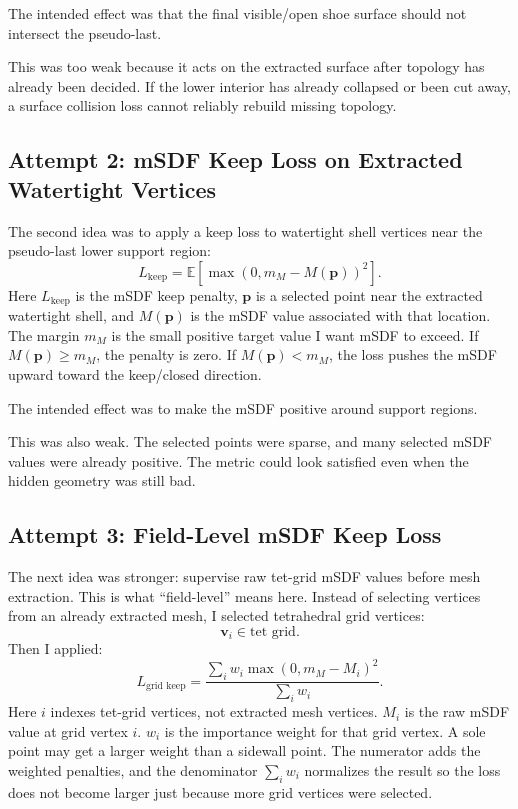 \documentclass[11pt]{article}
\newcommand{\pt}{\mathbf{p}}
\newcommand{\vtx}{\mathbf{v}}
\begin{document}
The intended effect was that the final visible/open shoe surface should not
intersect the pseudo-last.

This was too weak because it acts on the extracted surface after topology has
already been decided.  If the lower interior has already collapsed or been cut
away, a surface collision loss cannot reliably rebuild missing topology.

\subsection{Attempt 2: mSDF Keep Loss on Extracted Watertight Vertices}

The second idea was to apply a keep loss to watertight shell vertices near the
pseudo-last lower support region:
\[
L_{\text{keep}}
=
\mathbb{E}
\left[
\max(0,m_M-M(\pt))^2
\right].
\]
Here \(L_{\text{keep}}\) is the mSDF keep penalty, \(\pt\) is a selected point
near the extracted watertight shell, and \(M(\pt)\) is the mSDF value associated
with that location.  The margin \(m_M\) is the small positive target value I
want mSDF to exceed.  If \(M(\pt)\ge m_M\), the penalty is zero.  If
\(M(\pt)<m_M\), the loss pushes the mSDF upward toward the keep/closed
direction.

The intended effect was to make the mSDF positive around support regions.

This was also weak.  The selected points were sparse, and many selected mSDF
values were already positive.  The metric could look satisfied even when the
hidden geometry was still bad.

\subsection{Attempt 3: Field-Level mSDF Keep Loss}

The next idea was stronger: supervise raw tet-grid mSDF values before mesh
extraction.  This is what ``field-level'' means here.  Instead of selecting
vertices from an already extracted mesh, I selected tetrahedral grid vertices:
\[
\vtx_i \in \text{tet grid}.
\]
Then I applied:
\[
L_{\text{grid keep}}
=
\frac{\sum_i w_i\max(0,m_M-M_i)^2}{\sum_i w_i}.
\]
Here \(i\) indexes tet-grid vertices, not extracted mesh vertices.  \(M_i\) is
the raw mSDF value at grid vertex \(i\).  \(w_i\) is the importance weight for
that grid vertex.  A sole point may get a larger weight than a sidewall point.
The numerator adds the weighted penalties, and the denominator \(\sum_i w_i\)
normalizes the result so the loss does not become larger just because more grid
vertices were selected.
\end{document}
